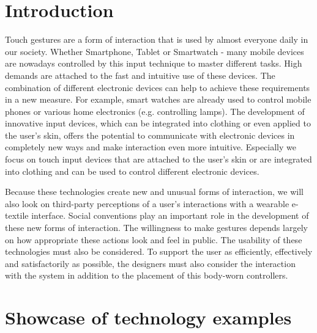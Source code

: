 \documentclass{sigchi}
\begin{document}
\section{Introduction}
%

Touch gestures are a form of interaction that is used by almost everyone daily in our society. Whether Smartphone, Tablet or Smartwatch - many mobile devices are nowadays controlled by this input technique to master different tasks. High demands are attached to the fast and intuitive use of these devices. The combination of different electronic devices can help to achieve these requirements in a new measure. For example, smart watches are already used to control mobile phones or various home electronics (e.g. controlling lamps). The development of innovative input devices, which can be integrated into clothing or even applied to the user's skin, offers the potential to communicate with electronic devices in completely new ways and make interaction even more intuitive. Especially we focus on touch input devices that are attached to the user's skin or are integrated into clothing and can be used to control different electronic devices.

Because these technologies create new and unusual forms of interaction, we will also look on third-party perceptions of a user’s interactions with a wearable e-textile interface. Social conventions play an important role in the development of these new forms of interaction. The willingness to make gestures depends largely on how appropriate these actions look and feel in public. \cite{touch-wrist} The usability of these technologies must also be considered. To support the user as efficiently, effectively and satisfactorily as possible, the designers must also consider the interaction with the system in addition to the placement of this body-worn controllers.

\section{Showcase of technology examples}
%
\end{document}
